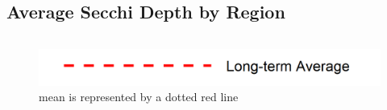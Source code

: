 \documentclass[
]{book}
\begin{document}
\hypertarget{average-secchi-depth-by-region}{%
\subsection{Average Secchi Depth by Region}\label{average-secchi-depth-by-region}}

\begin{columns-nocenter}

\begin{column}

\begin{figure}
\includegraphics[width=15.25in]{figures/mline} \caption{mean is represented by a dotted red line}\label{fig:unnamed-chunk-145}
\end{figure}

\end{column}

\begin{column}

\end{column}

\begin{column}

\end{column}

\end{columns-nocenter}
\end{document}
